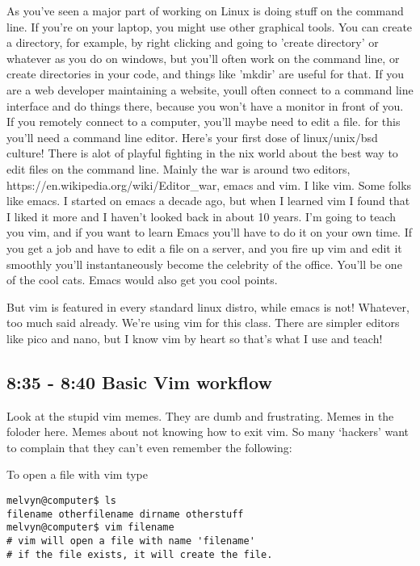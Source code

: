 \documentclass[10pt]{article}
\begin{document}
As you've seen a major part of working on Linux is doing stuff on the command line. 
If you're on your laptop, you might use other graphical tools. You can create a directory, for example, by right clicking and going to 'create directory' or whatever as you do on windows, but you'll often work on the command line, or create directories in your code, and things like 'mkdir' are useful for that. 
If you are a web developer maintaining a website, youll often connect to a command line interface and do things there, because you won't have a monitor in front of you. 
If you remotely connect to a computer, you'll maybe need to edit a file. for this you'll need a command line editor. Here's your first dose of linux/unix/bsd culture! There is alot of playful fighting in the \*nix world about the best way to edit files on the command line. Mainly the war is around two editors, https://en.wikipedia.org/wiki/Editor_war, emacs and vim. I like vim. Some folks like emacs. I started on emacs a decade ago, but when I learned vim I found that I liked it more and I haven't looked back in about 10 years. I'm going to teach you vim, and if you want to learn Emacs you'll have to do it on your own time. 
If you get a job and have to edit a file on a server, and you fire up vim and edit it smoothly you'll instantaneously become the celebrity of the office. You'll be one of the cool cats. Emacs would also get you cool points.

But vim is featured in every standard linux distro, while emacs is not! 
Whatever, too much said already. We're using vim for this class.
There are simpler editors like pico and nano, but I know vim by heart so that's what I use and teach!

\subsection*{8:35 - 8:40 Basic Vim workflow}
Look at the stupid vim memes. They are dumb and frustrating. Memes in the
foloder here. Memes about not knowing how to exit vim. So many `hackers'
want to complain that they can't even remember the following:

To open a file with vim type

\begin{lstlisting}[type=term]
melvyn@computer$ ls
filename otherfilename dirname otherstuff
melvyn@computer$ vim filename
# vim will open a file with name 'filename'
# if the file exists, it will create the file.
\end{lstlisting}
\end{document}
